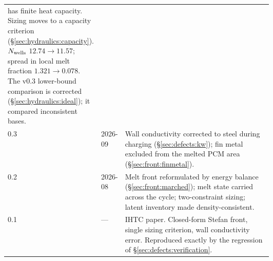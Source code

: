 \begin{longtable}{@{}l l p{0.60\linewidth}@{}}
  has finite heat capacity. Sizing moves to a capacity criterion
  (\S\ref{sec:hydraulics:capacity}). $N_{\mathrm{wells}}$ $12.74\to11.57$; spread in local
  melt fraction $1.321\to0.078$. The v0.3 lower-bound comparison is corrected
  (\S\ref{sec:hydraulics:ideal}); it compared inconsistent bases. \\
0.3 & 2026-09 &
  Wall conductivity corrected to steel during charging
  (\S\ref{sec:defects:kw}); fin metal excluded from the melted PCM area
  (\S\ref{sec:front:finmetal}). \\
0.2 & 2026-08 &
  Melt front reformulated by energy balance (\S\ref{sec:front:marched}); melt
  state carried across the cycle; two-constraint sizing; latent inventory made
  density-consistent. \\
0.1 & --- &
  IHTC paper. Closed-form Stefan front, single sizing criterion, wall
  conductivity error. Reproduced exactly by the regression of
  \S\ref{sec:defects:verification}. \\
\bottomrule
\end{longtable}
